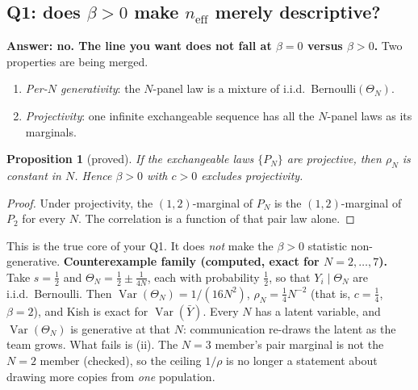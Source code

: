 \documentclass[11pt]{article}
\newtheorem{proposition}{Proposition}
\newcommand{\Var}{\operatorname{Var}}
\begin{document}
\subsection{Q1: does $\beta>0$ make $n_{\mathrm{eff}}$ merely descriptive?}
\textbf{Answer: no. The line you want does not fall at $\beta=0$ versus $\beta>0$.} Two properties are being merged.
\begin{enumerate}[nosep,label=(\roman*)]
\item \emph{Per-$N$ generativity}: the $N$-panel law is a mixture of i.i.d.\ Bernoulli$(\Theta_N)$.
\item \emph{Projectivity}: one infinite exchangeable sequence has all the $N$-panel laws as its marginals.
\end{enumerate}
\begin{proposition}[proved]\label{prop:proj}
If the exchangeable laws $\{P_N\}$ are projective, then $\rho_N$ is constant in $N$. Hence $\beta>0$ with $c>0$ excludes projectivity.
\end{proposition}
\begin{proof}
Under projectivity, the $(1,2)$-marginal of $P_N$ is the $(1,2)$-marginal of $P_2$ for every $N$. The correlation is a function of that pair law alone.
\end{proof}
This is the true core of your Q1. It does \emph{not} make the $\beta>0$ statistic non-generative. \textbf{Counterexample family (computed, exact for $N=2,\dots,7$).} Take $s=\tfrac12$ and $\Theta_N=\tfrac12\pm\tfrac1{4N}$, each with probability $\tfrac12$, so that $Y_i\mid\Theta_N$ are i.i.d.\ Bernoulli. Then $\Var(\Theta_N)=1/(16N^2)$, $\rho_N=\tfrac14N^{-2}$ (that is, $c=\tfrac14$, $\beta=2$), and Kish is exact for $\Var(\bar Y)$. Every $N$ has a latent variable, and $\Var(\Theta_N)$ is generative at that $N$: communication re-draws the latent as the team grows. What fails is (ii). The $N=3$ member's pair marginal is not the $N=2$ member (checked), so the ceiling $1/\rho$ is no longer a statement about drawing more copies from \emph{one} population.
\end{document}
